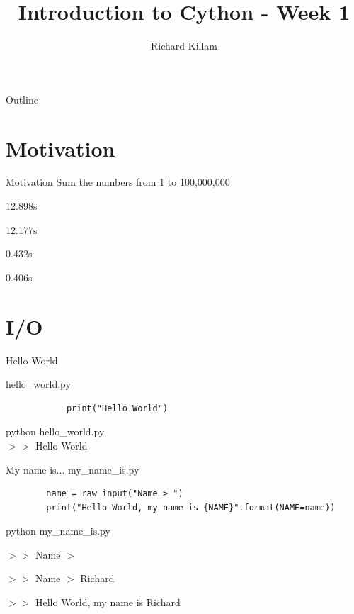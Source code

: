 \documentclass[11pt]{beamer}
\author{Richard Killam}
\title{Introduction to Cython - Week 1}
\newcommand{\emptyline}{$ $\\}
\begin{document}
\centering

\begin{frame}
	\titlepage
\end{frame}

\begin{frame}{Outline}
	\begin{multicols}{2}
		\tableofcontents
	\end{multicols}
\end{frame}

\section{Motivation}
\begin{frame}{Motivation}
	Sum the numbers from 1 to 100,000,000

	\begin{description}[style=multiline,topsep=10pt]
		\item[Python] 12.898s
		\item[Compiled Python] 12.177s
		\item[Cython] 0.432s
		\item[C] 0.406s
	\end{description}
\end{frame}

\section{I/O}
\begin{frame}[fragile]{Hello World}
	\begin{minipage}{0.45\linewidth}
		hello\_world.py
		\begin{lstlisting}
			print("Hello World")
		\end{lstlisting}
	\end{minipage}
	\pause
	\begin{minipage}{0.45\linewidth}
		python hello\_world.py
		\emptyline
		$>>$ Hello World
	\end{minipage}
\end{frame}

\begin{frame}[fragile]{My name is...}
	my\_name\_is.py
	\begin{lstlisting}
		name = raw_input("Name > ")
		print("Hello World, my name is {NAME}".format(NAME=name))
	\end{lstlisting}

	\pause
	
	python my\_name\_is.py
	
	$>>$ Name $>$ 
	
	$>>$ Name $>$ Richard
	
	$>>$ Hello World, my name is Richard
	
\end{frame}
\end{document}
